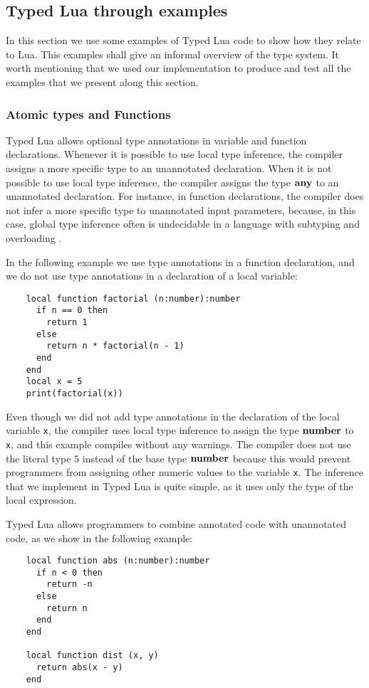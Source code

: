 \subsection{Typed Lua through examples}
\label{sec:examples}

In this section we use some examples of Typed Lua code to show how
they relate to Lua.
This examples shall give an informal overview of the type system.
It worth mentioning that we used our implementation to produce and
test all the examples that we present along this section.

\subsubsection{Atomic types and Functions}

Typed Lua allows optional type annotations in variable and function
declarations.
Whenever it is possible to use local type inference, the compiler
assigns a more specific type to an unannotated declaration.
When it is not possible to use local type inference, the compiler
assigns the type $\mathbf{any}$ to an unannotated declaration.
For instance, in function declarations, the compiler does not infer
a more specific type to unannotated input parameters, because,
in this case, global type inference often is undecidable in a
language with subtyping and overloading \citep{wells1999typability}.

In the following example we use type annotations in a function
declaration, and we do not use type annotations in a declaration of a
local variable:
\begin{verbatim}
    local function factorial (n:number):number
      if n == 0 then
        return 1
      else
        return n * factorial(n - 1)
      end
    end
    local x = 5
    print(factorial(x))
\end{verbatim}

Even though we did not add type annotations in the declaration of
the local variable \texttt{x}, the compiler uses local type inference to
assign the type $\mathbf{number}$ to \texttt{x}, and this example compiles
without any warnings.
The compiler does not use the literal type $5$ instead of the base
type $\mathbf{number}$ because this would prevent
programmers from assigning other numeric values to the variable
\texttt{x}.
The inference that we implement in Typed Lua is quite simple, as it
uses only the type of the local expression.

Typed Lua allows programmers to combine annotated code with
unannotated code, as we show in the following example:
\begin{verbatim}
    local function abs (n:number):number
      if n < 0 then
        return -n
      else
        return n
      end
    end

    local function dist (x, y)
      return abs(x - y)
    end
\end{verbatim}

